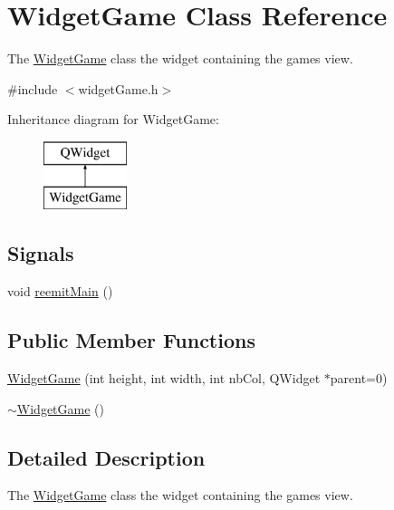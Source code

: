 \hypertarget{class_widget_game}{}\section{Widget\+Game Class Reference}
\label{class_widget_game}


The \hyperlink{class_widget_game}{Widget\+Game} class the widget containing the game\textquotesingle{}s view.  




{\ttfamily \#include $<$widget\+Game.\+h$>$}

Inheritance diagram for Widget\+Game\+:\begin{figure}[H]
\begin{center}
\leavevmode
\includegraphics[height=2.000000cm]{class_widget_game}
\end{center}
\end{figure}
\subsection*{Signals}
\begin{DoxyCompactItemize}
\item 
void \hyperlink{class_widget_game_a39c76aac5eff9242d2253017c1209027}{reemit\+Main} ()
\end{DoxyCompactItemize}
\subsection*{Public Member Functions}
\begin{DoxyCompactItemize}
\item 
\hyperlink{class_widget_game_a0c95303c9fc87b64d5fd3cd4f4fb5844}{Widget\+Game} (int height, int width, int nb\+Col, Q\+Widget $\ast$parent=0)
\item 
\hyperlink{class_widget_game_a5164870bf08c80da133fc075298347cc}{$\sim$\+Widget\+Game} ()
\end{DoxyCompactItemize}


\subsection{Detailed Description}
The \hyperlink{class_widget_game}{Widget\+Game} class the widget containing the game\textquotesingle{}s view. 

